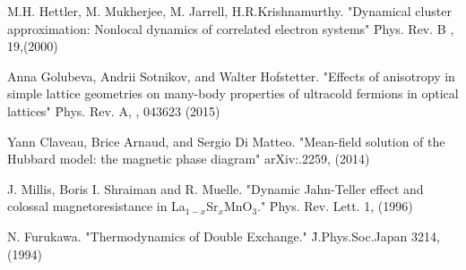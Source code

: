 \begin{thebibliography}{4}
{M.H. Hettler, M. Mukherjee, M. Jarrell, H.R.Krishnamurthy. "Dynamical cluster approximation: Nonlocal dynamics of correlated electron systems" \f{Phys. Rev. B} , 19,(2000)}

{Anna Golubeva, Andrii Sotnikov, and Walter Hofstetter. "Effects of anisotropy in simple lattice geometries on many-body properties of ultracold fermions in optical lattices" \f{Phys. Rev. A}, , 043623 (2015)} 

{ Yann Claveau, Brice Arnaud, and Sergio Di Matteo. "Mean-field solution of the Hubbard model: the magnetic phase diagram" \f{ 	arXiv:}.2259, (2014) }

{ J. Millis, Boris I. Shraiman and R. Muelle. "Dynamic Jahn-Teller effect and colossal magnetoresistance in La$_{1-x}$Sr$_x$MnO$_3$." \f{Phys. Rev. Lett}.  1, (1996) }

{N. Furukawa. "Thermodynamics of Double Exchange." \f{J.Phys.Soc.Japan}  3214, (1994)}

\end{thebibliography}

